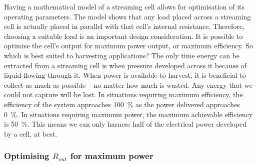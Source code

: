     Having a mathematical model of a streaming cell allows for optimisation of its operating parameters.
    The model shows that any load placed across a streaming cell is actually placed in parallel with that cell's internal resistance.
    Therefore, choosing a suitable load is an important design consideration.
    It is possible to optimise the cell's output for maximum power output, or maximum efficiency.
    So which is best suited to harvesting applications?
    The only time energy can be extracted from a streaming cell is when pressure developed across it because of liquid flowing through it.
    When power is available to harvest, it is beneficial to collect as much as possible -- no matter how much is wasted.
    Any energy that we could not capture will be lost.
    In situations requiring maximum efficiency, the efficiency of the system approaches \SI{100}{\percent} as the power delivered approaches \SI{0}{\percent}.
    In situations requiring maximum power, the maximum achievable efficiency is \SI{50}{\percent}.
    This means we can only harness half of the electrical power developed by a cell, at best.




    \subsubsection*{Optimising $R_{out}$ for maximum power}


